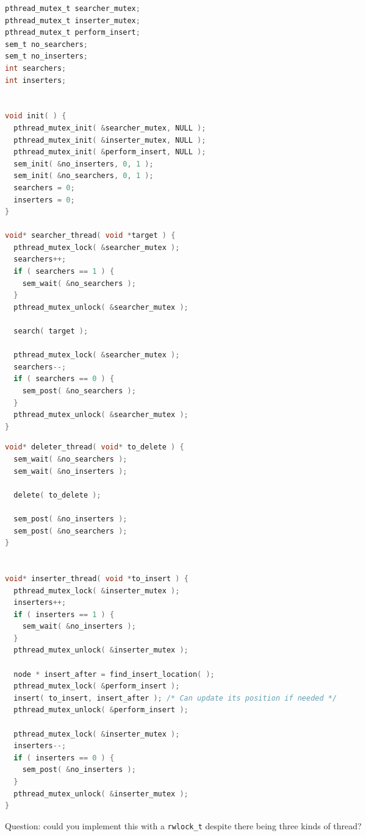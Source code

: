 	{\scriptsize
		\begin{multicols}{2}

			\begin{lstlisting}[language=C]
pthread_mutex_t searcher_mutex;
pthread_mutex_t inserter_mutex;
pthread_mutex_t perform_insert;
sem_t no_searchers;
sem_t no_inserters;
int searchers;
int inserters;


void init( ) {
  pthread_mutex_init( &searcher_mutex, NULL );
  pthread_mutex_init( &inserter_mutex, NULL );
  pthread_mutex_init( &perform_insert, NULL );
  sem_init( &no_inserters, 0, 1 );
  sem_init( &no_searchers, 0, 1 );
  searchers = 0;
  inserters = 0;
}

void* searcher_thread( void *target ) {
  pthread_mutex_lock( &searcher_mutex );
  searchers++;
  if ( searchers == 1 ) {
    sem_wait( &no_searchers );
  }
  pthread_mutex_unlock( &searcher_mutex );

  search( target );

  pthread_mutex_lock( &searcher_mutex );
  searchers--;
  if ( searchers == 0 ) {
    sem_post( &no_searchers );
  }
  pthread_mutex_unlock( &searcher_mutex );
}
\end{lstlisting}
			\columnbreak
			\begin{lstlisting}[language=C]
void* deleter_thread( void* to_delete ) {
  sem_wait( &no_searchers );
  sem_wait( &no_inserters );

  delete( to_delete );

  sem_post( &no_inserters );
  sem_post( &no_searchers );
}


void* inserter_thread( void *to_insert ) {
  pthread_mutex_lock( &inserter_mutex );
  inserters++;
  if ( inserters == 1 ) {
    sem_wait( &no_inserters );
  }
  pthread_mutex_unlock( &inserter_mutex );

  node * insert_after = find_insert_location( );
  pthread_mutex_lock( &perform_insert );
  insert( to_insert, insert_after ); /* Can update its position if needed */
  pthread_mutex_unlock( &perform_insert );

  pthread_mutex_lock( &inserter_mutex );
  inserters--;
  if ( inserters == 0 ) {
    sem_post( &no_inserters );
  }
  pthread_mutex_unlock( &inserter_mutex );
}
\end{lstlisting}
		\end{multicols}
	}

Question: could you implement this with a \texttt{rwlock\_t} despite there being three kinds of thread?






